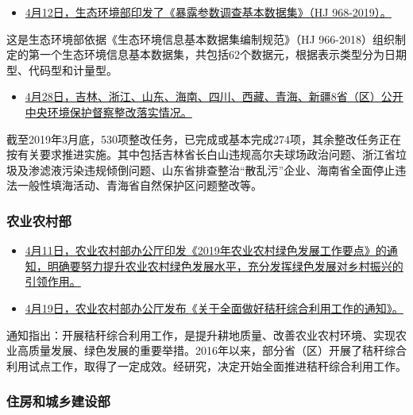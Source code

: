 \documentclass[
]{book}
\providecommand{\tightlist}{%
  \setlength{\itemsep}{0pt}\setlength{\parskip}{0pt}}
\begin{document}
\begin{itemize}
\tightlist
\item
  \href{http://fgs.mee.gov.cn/yfxzyfzzfjs/201904/t20190403_698483.shtml}{4月12日，生态环境部印发了《暴露参数调查基本数据集》（HJ 968-2019）。}
\end{itemize}

这是生态环境部依据《生态环境信息基本数据集编制规范》（HJ 966-2018）组织制定的第一个生态环境信息基本数据集，共包括62个数据元，根据表示类型分为日期型、代码型和计量型。

\begin{itemize}
\tightlist
\item
  \href{http://www.mee.gov.cn/xxgk2018/xxgk/xxgk15/201904/t20190428_701237.html}{4月28日，吉林、浙江、山东、海南、四川、西藏、青海、新疆8省（区）公开中央环境保护督察整改落实情况。}
\end{itemize}

截至2019年3月底，530项整改任务，已完成或基本完成274项，其余整改任务正在按有关要求推进实施。其中包括吉林省长白山违规高尔夫球场政治问题、浙江省垃圾及渗滤液污染违规倾倒问题、山东省排查整治``散乱污''企业、海南省全面停止违法一般性填海活动、青海省自然保护区问题整改等。

\hypertarget{ux519cux4e1aux519cux6751ux90e8}{%
\subsubsection*{农业农村部}\label{ux519cux4e1aux519cux6751ux90e8}}

\begin{itemize}
\item
  \href{http://www.moa.gov.cn/ztzl/2019gzzd/sjgzyd/201904/t20190416_6179510.htm}{4月11日，农业农村部办公厅印发《2019年农业农村绿色发展工作要点》的通知，明确要努力提升农业农村绿色发展水平，充分发挥绿色发展对乡村振兴的引领作用。}
\item
  \href{http://www.mee.gov.cn/xxgk2018/xxgk/xxgk01/201903/t20190312_695462.html}{4月19日，农业农村部办公厅发布《关于全面做好秸秆综合利用工作的通知》。}
\end{itemize}

通知指出：开展秸秆综合利用工作，是提升耕地质量、改善农业农村环境、实现农业高质量发展、绿色发展的重要举措。2016年以来，部分省（区）开展了秸秆综合利用试点工作，取得了一定成效。经研究，决定开始全面推进秸秆综合利用工作。

\hypertarget{ux4f4fux623fux548cux57ceux4e61ux5efaux8bbeux90e8}{%
\subsubsection*{住房和城乡建设部}\label{ux4f4fux623fux548cux57ceux4e61ux5efaux8bbeux90e8}}
\end{document}
